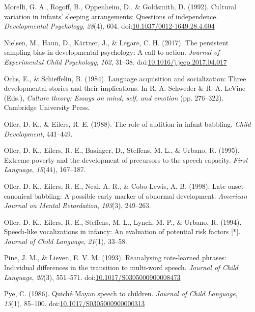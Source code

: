 \documentclass[floatsintext,man]{apa6}
\theoremstyle{definition}
\theoremstyle{definition}
\theoremstyle{definition}
\theoremstyle{remark}
\begin{document}
\hypertarget{ref-morelli1992cultural}{}
Morelli, G. A., Rogoff, B., Oppenheim, D., \& Goldsmith, D. (1992).
Cultural variation in infants' sleeping arrangements: Questions of
independence. \emph{Developmental Psychology}, \emph{28}(4), 604.
doi:\href{https://doi.org/10.1037/0012-1649.28.4.604}{10.1037/0012-1649.28.4.604}

\hypertarget{ref-nielsen2017persistent}{}
Nielsen, M., Haun, D., Kärtner, J., \& Legare, C. H. (2017). The
persistent sampling bias in developmental psychology: A call to action.
\emph{Journal of Experimental Child Psychology}, \emph{162}, 31--38.
doi:\href{https://doi.org/10.1016/j.jecp.2017.04.017}{10.1016/j.jecp.2017.04.017}

\hypertarget{ref-ochs1984language}{}
Ochs, E., \& Schieffelin, B. (1984). Language acquisition and
socialization: Three developmental stories and their implications. In R.
A. Schweder \& R. A. LeVine (Eds.), \emph{Culture theory: Essays on
mind, self, and emotion} (pp. 276--322). Cambridge University Press.

\hypertarget{ref-oller1988role}{}
Oller, D. K., \& Eilers, R. E. (1988). The role of audition in infant
babbling. \emph{Child Development}, 441--449.

\hypertarget{ref-oller1995extreme}{}
Oller, D. K., Eilers, R. E., Basinger, D., Steffens, M. L., \& Urbano,
R. (1995). Extreme poverty and the development of precursors to the
speech capacity. \emph{First Language}, \emph{15}(44), 167--187.

\hypertarget{ref-oller1998late}{}
Oller, D. K., Eilers, R. E., Neal, A. R., \& Cobo-Lewis, A. B. (1998).
Late onset canonical babbling: A possible early marker of abnormal
development. \emph{American Journal on Mental Retardation},
\emph{103}(3), 249--263.

\hypertarget{ref-oller1994speech}{}
Oller, D. K., Eilers, R. E., Steffens, M. L., Lynch, M. P., \& Urbano,
R. (1994). Speech-like vocalizations in infancy: An evaluation of
potential risk factors {[}*{]}. \emph{Journal of Child Language},
\emph{21}(1), 33--58.

\hypertarget{ref-pine1993reanalysing}{}
Pine, J. M., \& Lieven, E. V. M. (1993). Reanalysing rote-learned
phrases: Individual differences in the transition to multi-word speech.
\emph{Journal of Child Language}, \emph{20}(3), 551--571.
doi:\href{https://doi.org/10.1017/S0305000900008473}{10.1017/S0305000900008473}

\hypertarget{ref-pye1986quiche}{}
Pye, C. (1986). Quiché Mayan speech to children. \emph{Journal of Child
Language}, \emph{13}(1), 85--100.
doi:\href{https://doi.org/10.1017/S0305000900000313}{10.1017/S0305000900000313}
\end{document}

